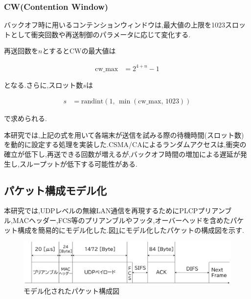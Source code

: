 \documentclass[a4paper, 10pt]{ltjsarticle}
\begin{document}
\subsubsection{CW(Contention Window)}

バックオフ時に用いるコンテンションウィンドウは,最大値の上限を1023スロットとして衝突回数や再送制御のパラメータに応じて変化する.

再送回数を$n$とするとCWの最大値は



\begin{align}
  \text{cw\_max} &= 2^{4 + n} - 1
\end{align}

となる.さらに,スロット数$s$は

\begin{align}
  s &= \mathrm{randint}(1, \, \min(\text{cw\_max}, \, 1023))
  \label{slot}
\end{align}

で求められる.

本研究では,上記の式を用いて各端末が送信を試みる際の待機時間(スロット数)を動的に設定する処理を実装した.CSMA/CAによるランダムアクセスは,衝突の確立が低下し,再送できる回数が増えるが,バックオフ時間の増加による遅延が発生し,スループットが低下する可能性がある.

\subsection{パケット構成モデル化}

本研究では,UDPレベルの無線LAN通信を再現するためにPLCPプリアンブル,MACヘッダー,FCS等のプリアンブルやフッタ,オーバーヘッドを含めたパケット構成を簡易的にモデル化した.図\ref{packet}にモデル化したパケットの構成図を示す.





\begin{figure}[H]
  \centering
  \includegraphics[width=1\columnwidth]{./assets/packet.png}
  \caption{モデル化されたパケット構成図}
  \label{packet}
\end{figure}
\end{document}
